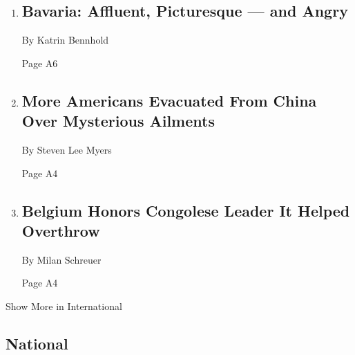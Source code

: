 \begin{enumerate}
\def\labelenumi{\arabic{enumi}.}
\item
  \href{/2018/06/30/world/europe/bavaria-immigration-afd-munich.html}{}

  \hypertarget{bavaria-affluent-picturesque--and-angry-1}{%
  \subsection{Bavaria: Affluent, Picturesque --- and
  Angry}\label{bavaria-affluent-picturesque--and-angry-1}}

  By Katrin Bennhold

  Page A6
\item
  \href{/2018/06/30/world/asia/china-sonic-guangzhou.html}{}

  \hypertarget{more-americans-evacuated-from-china-over-mysterious-ailments}{%
  \subsection{More Americans Evacuated From China Over Mysterious
  Ailments}\label{more-americans-evacuated-from-china-over-mysterious-ailments}}

  By Steven Lee Myers

  Page A4
\item
  \href{/2018/06/30/world/europe/belgium-brussels-congo-patrice-lumumba.html}{}

  \hypertarget{belgium-honors-congolese-leader-it-helped-overthrow}{%
  \subsection{Belgium Honors Congolese Leader It Helped
  Overthrow}\label{belgium-honors-congolese-leader-it-helped-overthrow}}

  By Milan Schreuer

  Page A4
\end{enumerate}

Show More in International

\hypertarget{national}{%
\subsection{National}\label{national}}

